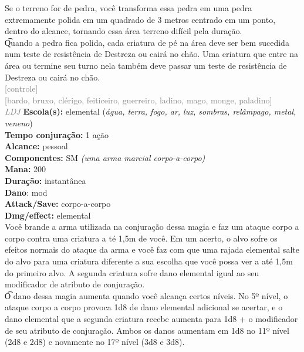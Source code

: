\documentclass{RPG_Adventure}[2021/10/20]
\begin{document}
{\normalsize Se o terreno for de pedra, você transforma essa pedra em uma pedra extremamente polida em um quadrado de 3 metros centrado em um ponto, dentro do alcance, tornando essa área terreno difícil pela duração.\\\t Quando a pedra fica polida, cada criatura de pé na área deve ser bem sucedida num teste de resistência de Destreza ou cairá no chão. Uma criatura que entre na área ou termine seu turno nela também deve passar um teste de resistência de Destreza ou cairá no chão.\\}
{\scriptsize \textcolor{gray}{[controle]\\}}
{\scriptsize \textcolor{gray}{[bardo, bruxo, clérigo, feiticeiro, guerreiro, ladino, mago, monge, paladino]\\}}
{\tiny \textcolor{gray}{\textit{LDJ}}}
{\small \t \textbf{Escola(s):} elemental (\textit{água, terra, fogo, ar, luz, sombras, relâmpago, metal, veneno})\\\t \textbf{Tempo conjuração:} 1 ação\\\t \textbf{Alcance:} pessoal\\\t \textbf{Componentes:} SM \textit{(uma arma marcial corpo-a-corpo)}\\\t \textbf{Mana:} 200\\\t \textbf{Duração:} instantânea\\\t \textbf{Dano}: mod\\\t \textbf{Attack/Save:} corpo-a-corpo\\\t \textbf{Dmg/effect:} elemental\\}
{\normalsize Você brande a arma utilizada na conjuração dessa magia e faz um ataque corpo a corpo contra uma criatura a té 1,5m de você. Em um acerto, o alvo sofre os efeitos normais do ataque da arma e você faz com que uma rajada elemental salte do alvo para uma criatura diferente a sua escolha que você possa ver a até 1,5m do primeiro alvo. A segunda criatura sofre dano elemental igual ao seu modificador de atributo de conjuração.\\\t O dano dessa magia aumenta quando você alcança certos níveis. No 5º nível, o ataque corpo a corpo provoca 1d8 de dano elemental adicional se acertar, e o dano elemental que a segunda criatura recebe aumenta para 1d8 + o modificador de seu atributo de conjuração. Ambos os danos aumentam em 1d8 no 11º nível (2d8 e 2d8) e novamente no 17º nível (3d8 e 3d8).\\}
\end{document}

